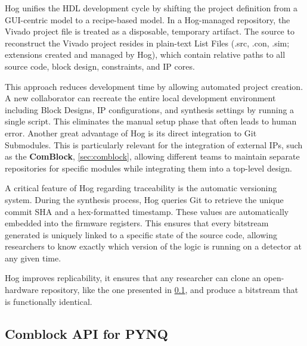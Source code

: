 Hog unifies the HDL development cycle by shifting the project definition from a GUI-centric model to a recipe-based model. In a Hog-managed repository, the Vivado project file is treated as a disposable, temporary artifact. The source to reconstruct the Vivado project resides in plain-text List Files (.src, .con, .sim; extensions created and managed by Hog), which contain relative paths to all source code, block design, constraints, and IP cores.

This approach reduces development time by allowing automated project creation. A new collaborator can recreate the entire local development environment including Block Designs, IP configurations, and synthesis settings by running a single script. This eliminates the manual setup phase that often leads to human error. Another great advantage of Hog is its direct integration to Git Submodules. This is particularly relevant for the integration of external IPs, such as the \textbf{ComBlock}, \cref{sec:comblock}, allowing different teams to maintain separate repositories for specific modules while integrating them into a top-level design. 

A critical feature of Hog regarding traceability is the automatic versioning system. During the synthesis process, Hog queries Git to retrieve the unique commit SHA and a hex-formatted timestamp. These values are automatically embedded into the firmware registers. This ensures that every bitstream generated is uniquely linked to a specific state of the source code, allowing researchers to know exactly which version of the logic is running on a detector at any given time.


Hog improves replicability, it ensures that any researcher can clone an open-hardware repository, like the one presented in \cref{sec:comblock_API}, and produce a bitstream that is functionally identical. 


\subsection{Comblock API for PYNQ} 
\label{sec:comblock_API}

